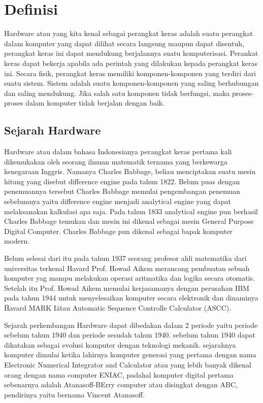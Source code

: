 
\section{Definisi}
Hardware atau yang kita kenal sebagai perangkat keras adalah suatu perangkat dalam komputer yang dapat dilihat secara langsung maupun dapat
disentuh, perangkat keras ini dapat mendukung berjalannya suatu komputerisasi. Perankat keras dapat bekerja apabila ada perintah yang
dilakukan kepada perangkat keras ini. Secara fisik, perangkat keras memiliki komponen-komponen yang terdiri dari suatu sistem. Sistem
adalah suatu komponen-komponen yang saling berhubungan dan saling mendukung. Jika salah satu komponen tidak berfungsi, maka proses-
proses dalam komputer tidak berjalan dengan baik.

\subsection{Sejarah Hardware}
Hardware atau dalam bahasa Indonesianya perangkat keras pertama kali dikemukakan oleh seorang ilmuan matematik ternama yang berkewarga
kenegaraan Inggris. Namanya Charles Babbage, beliau menciptakan suatu mesin hitung yang disebut difference engine pada tahun 1822.
Belum puas dengan penemuannya tersebut Charles Babbage memulai pengembangan penemuan sebelumnya yaitu difference engine menjadi
analytical engine yang dapat melaksanakan kalkulasi apa saja. Pada tahun 1833 analytical engine pun berhasil Charles Babbage temukan
dan mesin ini dikenal sebagai mesin General Purpose Digital Computer. Charles Babbage pun dikenal sebagai bapak komputer modern.

Belum selesai dari itu pada tahun 1937 seorang profesor ahli matematika dari universitas terkenal Havard Prof. Howad Aikem merancang
pembuatan sebuah komputer yag mampu melakukan operasi aritmatika dan logika secara otomatis. Setelah itu Prof. Howad Aikem memulai
kerjasamanya dengan perusahan IBM pada tahun 1944 untuk menyelesaikan komputer secara elektronik dan dinaminya \"Havard MARK I\" atau
Automatic Sequence Controlle Calculator (ASCC).

Sejarah perkembangan Hardware dapat dibedakan dalam 2 periode yaitu periode sebelum tahun 1940 dan periode sesudah tahun 1940. 
sebelum tahun 1940 dapat dikatakan sebagai evolusi komputer dengan teknologi mekanik. sejarahnya komputer dimulai ketika lahirnya 
komputer generasi yang pertama dengan nama Electronic Numerical Integrator and Calculator atau yang lebih banyak dikenal orang dengan 
nama computer ENIAC, padahal komputer digital pertama sebenarnya adalah Atanasoff-BErry computer atau disingkat dengan ABC,
pendirinya yaitu bernama Vincent Atanasoff.
 
